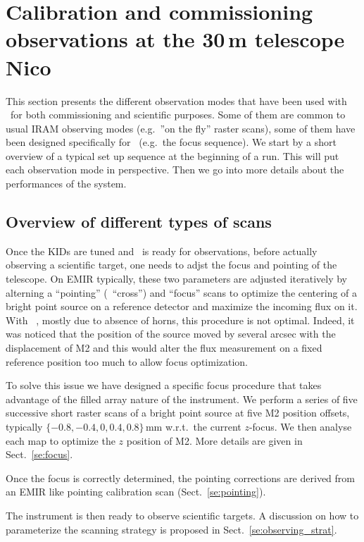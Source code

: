 
\section{Calibration and commissioning observations at the 30\,m telescope {\color{blue} Nico}}

This section presents the different observation modes that have been used with
\nika\ for both commissioning and scientific purposes. Some of them are common
to usual IRAM observing modes (e.g.~''on the fly'' raster scans), some of them
have been designed specifically for \nika\ (e.g.~the focus sequence). We start
by a short overview of a typical set up sequence at the beginning of a run. This
will put each observation mode in perspective. Then we go into more details
about the performances of the system.

\subsection{Overview of different types of scans}

Once the KIDs are tuned and \nika\ is ready for observations, before actually
observing a scientific target, one needs to adjst the focus and pointing of the
telescope. On EMIR typically, these two parameters are adjusted iteratively by
alterning a ``pointing'' (\aka\ ``cross'') and ``focus'' scans to optimize the
centering of a bright point source on a reference detector and maximize the
incoming flux on it. With \nika\ , mostly due to absence of horns, this
procedure is not optimal. Indeed, it was noticed that the position of the source
moved by several arcsec with the displacement of M2 and this would alter the flux
measurement on a fixed reference position too much to allow focus
optimization.

To solve this issue we have designed a specific focus procedure
that takes advantage of the filled array nature of the instrument. We perform a
series of five successive short raster scans of a bright point source at five M2 position
offsets, typically $\{-0.8, -0.4, 0, 0.4, 0.8\}$\,mm w.r.t.~the current
$z$-focus. We then analyse each map to optimize the $z$ position of M2. More details are
given in Sect.~\ref{se:focus}.

Once the focus is correctly determined, the pointing corrections are derived
from an EMIR like pointing calibration scan (Sect.~\ref{se:pointing}).

The instrument is then ready to observe scientific targets. A discussion on how
to parameterize the scanning strategy is proposed in Sect.~\ref{se:observing_strat}.


